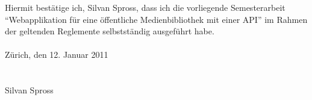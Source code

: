 Hiermit bestätige ich, Silvan Spross, dass ich die vorliegende Semesterarbeit
"`Webapplikation für eine öffentliche Medienbibliothek mit einer API"' im
Rahmen der geltenden Reglemente selbstständig ausgeführt habe.\\
\\
Zürich, den 12. Januar 2011\\
\\\\
Silvan Spross